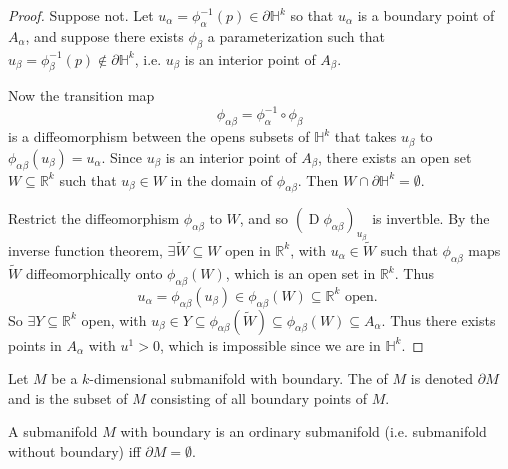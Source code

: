\documentclass[notoc,notitlepage]{tufte-book}
\DeclareMathOperator{\D}{D}
\begin{document}
\begin{proof}
  Suppose not. Let $u_\alpha = \phi_\alpha^{-1}(p) \in \partial \mathbb{H}^k$ so
  that $u_\alpha$ is a boundary point of $A_\alpha$, and suppose there exists
  $\phi_\beta$ a parameterization such that $u_\beta = \phi_\beta^{-1}(p) \notin
  \partial \mathbb{H}^k$, i.e. $u_\beta$ is an interior point of $A_\beta$.

  Now the transition map
  \begin{equation*}
    \phi_{\alpha\beta} = \phi_\alpha^{-1} \circ \phi_\beta
  \end{equation*}
  is a diffeomorphism between the opens subsets of $\mathbb{H}^k$ that takes
  $u_\beta$ to $\phi_{\alpha\beta}(u_\beta) = u_\alpha$. Since $u_\beta$ is an
  interior point of $A_\beta$, there exists an open set $W \subseteq
  \mathbb{R}^k$ such that $u_\beta \in W$ in the domain of $\phi_{\alpha\beta}$.
  Then $W \cap \partial \mathbb{H}^k = \emptyset$.

  Restrict the diffeomorphism $\phi_{\alpha\beta}$ to $W$, and so $(\D
  \phi_{\alpha\beta})_{u_\beta}$ is invertble. By the inverse function theorem,
  $\exists \tilde{W} \subseteq W$ open in $\mathbb{R}^k$, with $u_\alpha \in
  \tilde{W}$ such that $\phi_{\alpha\beta}$ maps $\tilde{W}$ diffeomorphically
  onto $\phi_{\alpha\beta}(W)$, which is an open set in $\mathbb{R}^k$. Thus
  \begin{equation*}
    u_\alpha = \phi_{\alpha\beta}(u_\beta) \in \phi_{\alpha\beta} (W) \subseteq
    \mathbb{R}^k \text{ open. }
  \end{equation*}
  So $\exists Y \subseteq \mathbb{R}^k$ open, with $u_\beta \in Y \subseteq
  \phi_{\alpha\beta}(\tilde{W}) \subseteq \phi_{\alpha\beta}(W) \subseteq
  A_{\alpha}$. Thus there exists points in $A_\alpha$ with $u^1 > 0$, which is
  impossible since we are in $\mathbb{H}^k$.
\end{proof}

\begin{defn}\label{defn:boundary_of_a_submanifold}
  Let $M$ be a $k$-dimensional submanifold with boundary. The 
  of $M$ is denoted $\partial M$ and is the subset of $M$ consisting of all
  boundary points of $M$.
\end{defn}

\begin{note}
  A submanifold $M$ with boundary is an ordinary submanifold (i.e. submanifold
  without boundary) iff $\partial M = \emptyset$.
\end{note}
\end{document}
